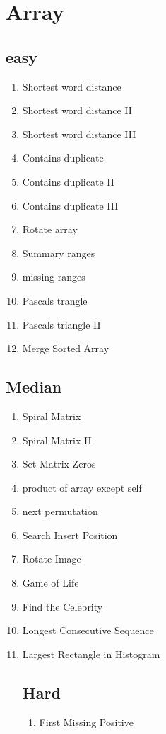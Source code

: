 \documentclass[DIV=calc, paper=a4, fontsize=11pt, twocolumn]{scrartcl}	 %
\begin{document}

\section*{Array}

\subsection*{easy}
\begin{enumerate}
\item Shortest word distance \cite{243}
\item Shortest word distance II \cite{244}
\item Shortest word distance III \cite{245}
\item Contains duplicate \cite{217}
\item Contains duplicate II \cite{219}
\item Contains duplicate III \cite{220}
\item Rotate array \cite{189}
\item Summary ranges \cite{228}
\item missing ranges \cite{163}
\item Pascals trangle \cite{118}
\item Pascals triangle II \cite{119}
\item Merge Sorted Array \cite{088}
\end{enumerate}

\subsection*{Median}
\begin{enumerate}
\item Spiral Matrix \cite{054}
\item Spiral Matrix II \cite{059}
\item Set Matrix Zeros \cite{073}
\item product of array except self \cite{238}
\item next permutation \cite{031}
\item Search Insert Position \cite{035}
\item Rotate Image \cite{048}
\item Game of Life \cite{289}
\item Find the Celebrity \cite{277}
\item Longest Consecutive Sequence \cite{128}
\item {\color{red} Largest Rectangle in Histogram} \cite{084}

\subsection*{Hard}
\begin{enumerate}
\item First Missing Positive \cite{041}
\end{enumerate}

\end{enumerate}
\end{document}
